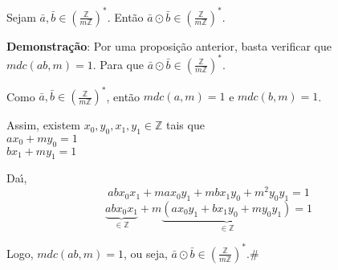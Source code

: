 \begin{proposicao} Sejam $\bar{a},\bar{b}\in\left(\displaystyle\frac{\mathbb{Z}}{m\mathbb{Z}}\right)^{*}$. Ent{\~a}o $\bar{a}\odot\bar{b}\in\left(\displaystyle\frac{\mathbb{Z}}{m\mathbb{Z}}\right)^{*}$.\end{proposicao}

\textbf{Demonstra{\c c}{\~a}o}: Por uma proposi{\c c}{\~a}o anterior, basta verificar que\\ $mdc(ab,m)=1$. Para que $\bar{a}\odot\bar{b}\in\left(\displaystyle\frac{\mathbb{Z}}{m\mathbb{Z}}\right)^{*}$.

Como $\bar{a},\bar{b}\in\left(\displaystyle\frac{\mathbb{Z}}{m\mathbb{Z}}\right)^{*}$, ent{\~a}o $mdc(a,m)=1$ e $mdc(b,m)=1$.

Assim, existem $x_{0},y_{0},x_{1},y_{1}\in\mathbb{Z}$ tais que\\
$ax_{0}+my_{0}=1$\\
$bx_{1}+my_{1}=1$

Da{\'\i},
\[abx_{0}x_{1}+max_{0}y_{1}+mbx_{1}y_{0}+m^{2}y_{0}y_{1}=1\]
\[\underbrace{abx_{0}x_{1}}_{\in\mathbb{Z}}+m\underbrace{(ax_{0}y_{1}+bx_{1}y_{0}+my_{0}y_{1})}_{\in\mathbb{Z}}=1\]

Logo, $mdc(ab,m)=1$, ou seja, $\bar{a}\odot\bar{b}\in\left(\displaystyle\frac{\mathbb{Z}}{m\mathbb{Z}}\right)^{*}$.\#